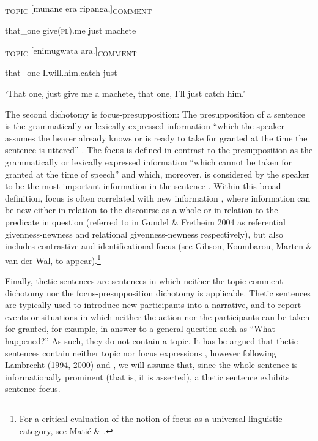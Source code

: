 \documentclass[output=paper]{langsci/langscibook}
\begin{document}
\ea\label{ex:}
\\
\gll [Oyo]\textsubscript{TOPIC} [munane era ripanga,]\textsubscript{COMMENT}\\
\begin{styleUntitledi}
that\_one give(\textsc{pl}).me just machete
\end{styleUntitledi}

\gll [oyo]\textsubscript{TOPIC} [enimugwata ara.]\textsubscript{COMMENT}\\
\begin{styleUntitledi}
that\_one I.will.him.catch just
\end{styleUntitledi}

\glt \textup{‘}\textup{That one, just give me a machete, that one, I’ll just catch him.’}
\z

The second dichotomy is focus-presupposition: The presupposition of a sentence is the grammatically or lexically expressed information “which the speaker assumes the hearer already knows or is ready to take for granted at the time the sentence is uttered” \citep[52]{Lambrecht1994}. The focus is defined in contrast to the presupposition as the grammatically or lexically expressed information “which cannot be taken for granted at the time of speech” \citep[207]{Lambrecht1994} and which, moreover, is considered by the speaker to be the most important information in the sentence \citep[277]{Dik1989}. Within this broad definition, focus is often correlated with new information \citep[39]{Good2010}, where information can be new either in relation to the discourse as a whole or in relation to the predicate in question (referred to in Gundel \& Fretheim 2004 as referential givenness-newness and relational givenness-newness respectively), but also includes contrastive and identificational focus (see Gibson, Koumbarou, Marten \& van der Wal, to appear).\footnote{For a critical evaluation of the notion of focus as a universal linguistic category, see Matić \& \citet{Wedgwood2013}.}

Finally, thetic sentences are sentences in which neither the topic-comment dichotomy nor the focus-presupposition dichotomy is applicable. Thetic sentences are typically used to introduce new participants into a narrative, and to report events or situations in which neither the action nor the participants can be taken for granted, for example, in answer to a general question such as “What happened?” As such, they do not contain a topic. It has be argued that thetic sentences contain neither topic nor focus expressions \citep[755]{Yoneda2011}, however following Lambrecht (1994, 2000) and \citet[55]{Nicolle2015b}, we will assume that, since the whole sentence is informationally prominent (that is, it is asserted), a thetic sentence exhibits sentence focus.
\end{document}
